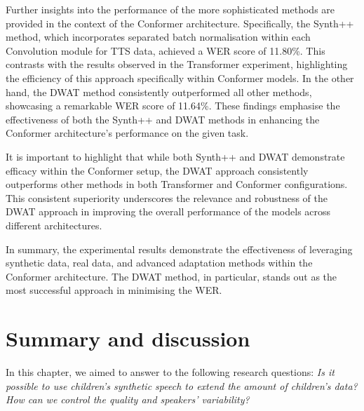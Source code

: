 Further insights into the performance of the more sophisticated methods are provided in the context of the Conformer architecture. Specifically, the Synth++ method, which incorporates separated batch normalisation within each Convolution module for \ac{TTS} data, achieved a \ac{WER} score of 11.80\%. This contrasts with the results observed in the Transformer experiment, highlighting the efficiency of this approach specifically within Conformer models. In the other hand, the \ac{DWAT} method consistently outperformed all other methods, showcasing a remarkable \ac{WER} score of 11.64\%. These findings emphasise the effectiveness of both the Synth++ and \ac{DWAT} methods in enhancing the Conformer architecture's performance on the given task.

It is important to highlight that while both Synth++ and \ac{DWAT} demonstrate efficacy within the Conformer setup, the \ac{DWAT} approach consistently outperforms other methods in both Transformer and Conformer configurations. This consistent superiority underscores the relevance and robustness of the \ac{DWAT} approach in improving the overall performance of the models across different architectures.

In summary, the experimental results demonstrate the effectiveness of leveraging synthetic data, real data, and advanced adaptation methods within the Conformer architecture. The \ac{DWAT} method, in particular, stands out as the most successful approach in minimising the \ac{WER}.


\section{Summary and discussion}
\label{section:conclusions_TTS}

In this chapter, we aimed to answer to the following research questions: \textit{Is it possible to use children's synthetic speech to extend the amount of children's data? How can we control the quality and speakers’ variability?}


